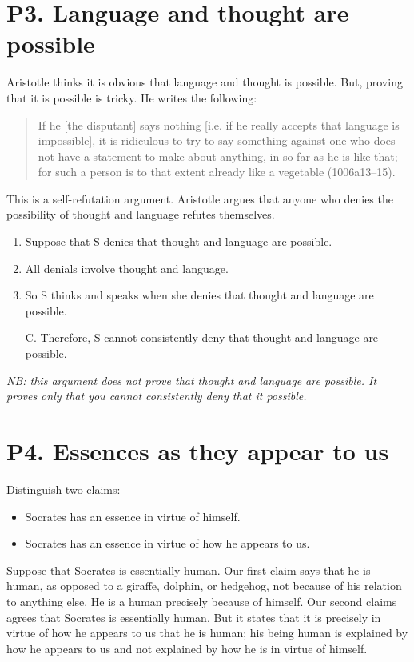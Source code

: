 \documentclass[article,oneside]{memoir}
\begin{document}
\section{P3. Language and thought are possible}

Aristotle thinks it is obvious that language and thought is possible. But, proving that it is possible is tricky. He writes the following: 

\begin{quote}
If he [the disputant] says nothing [i.e. if he really accepts that language is impossible], it is ridiculous to try to say something against one who does not have a statement to make about anything, in so far as he is like that; for such a person is to that extent already like a vegetable (1006a13–15).
\end{quote}
This is a self-refutation argument. Aristotle argues that anyone who denies the possibility of thought and language refutes themselves. 

\begin{enumerate}
\item Suppose that S denies that thought and language are possible. 
\item All denials involve thought and language. 
\item So S thinks and speaks when she denies that thought and language are possible. 
\item[C.] Therefore, S cannot consistently deny that thought and language are possible. 
\end{enumerate}

\noindent \emph{NB: this argument does not prove that thought and language are possible. It proves only that you cannot consistently deny that it possible.}

\section{P4. Essences as they appear to us}

Distinguish two claims: 
\begin{itemize}
\item Socrates has an essence in virtue of himself. 
\item Socrates has an essence in virtue of how he appears to us. 
\end{itemize}
Suppose that Socrates is essentially human. Our first claim says that he is human, as opposed to a giraffe, dolphin, or hedgehog, not because of his relation to anything else. He is a human precisely because of himself. Our second claims agrees that Socrates is essentially human. But it states that it is precisely in virtue of how he appears to us that he is human; his being human is explained by how he appears to us and not explained by how he is in virtue of himself. 
\end{document}

